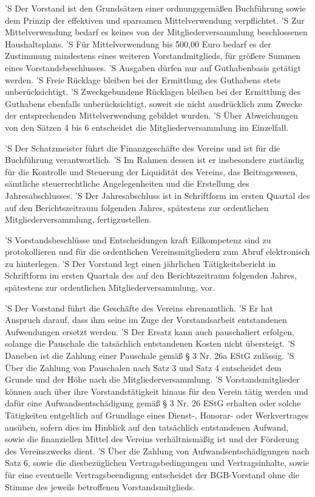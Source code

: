 \documentclass[a4paper,10pt]{scrreprt}
\begin{document}
\begin{contract}
'S Der Vorstand ist den Grundsätzen einer ordnungsgemäßen Buchführung sowie dem
Prinzip der effektiven und sparsamen Mittelverwendung verpflichtet.
'S Zur Mittelverwendung bedarf es keines von der Mitgliederversammlung
beschlossenen Haushaltsplans.
'S Für Mittelverwendung bis 500,00 Euro bedarf es der Zustimmung mindestens
eines weiteren Vorstandmitglieds, für größere Summen eines Vorstandsbeschlusses.
'S Ausgaben dürfen nur auf Guthabenbasis getätigt werden.
'S Freie Rücklage bleiben bei der Ermittlung des Guthabens stets
unberücksichtigt.
'S Zweckgebundene Rücklagen bleiben bei der Ermittlung des Guthabens ebenfalls
unberücksichtigt, soweit sie nicht ausdrücklich zum Zwecke der entsprechenden
Mittelverwendung gebildet wurden.
'S Über Abweichungen von den Sätzen 4 bis 6 entscheidet die
Mitgliederversammlung im Einzelfall.

'S Der Schatzmeister führt die Finanzgeschäfte des Vereins und ist für die
Buchführung verantwortlich.
'S Im Rahmen dessen ist er insbesondere zuständig für die Kontrolle und
Steuerung der Liquidität des Vereins, das Beitragswesen, sämtliche
steuerrechtliche Angelegenheiten und die Erstellung des Jahresabschlusses.
'S Der Jahresabschluss ist in Schriftform im ersten Quartal des auf den
Berichtszeitraum folgenden Jahres, spätestens zur ordentlichen
Mitgliederversammlung, fertigzustellen.

'S Vorstandsbeschlüsse und Entscheidungen kraft Eilkompetenz sind zu
protokollieren und für die ordentlichen Vereinsmitgliedern zum Abruf
elektronisch zu hinterlegen.
'S Der Vorstand legt einen jährlichen Tätigkeitsbericht in Schriftform im
ersten Quartals des auf den Berichtszeitraum folgenden Jahres, spätestens zur
ordentlichen Mitgliederversammlung, vor.

'S Der Vorstand führt die Geschäfte des Vereins ehrenamtlich.
'S Er hat Anspruch darauf, dass ihm seine im Zuge der Vorstandsarbeit
entstandenen Aufwendungen ersetzt werden.
'S Der Ersatz kann auch pauschaliert erfolgen, solange die Pauschale die
tatsächlich entstandenen Kosten nicht übersteigt.
'S Daneben ist die Zahlung einer Pauschale gemäß § 3 Nr. 26a EStG zulässig.
'S Über die Zahlung von Pauschalen nach Satz 3 und Satz 4 entscheidet dem
Grunde und der Höhe nach die Mitgliederversammlung.
'S Vorstandsmitglieder können auch über ihre Vorstandstätigkeit hinaus für den
Verein tätig werden und dafür eine Aufwandsentschädigung gemäß § 3 Nr. 26 EStG
erhalten oder solche Tätigkeiten entgeltlich auf Grundlage eines Dienst-,
Honorar- oder Werkvertrages ausüben, sofern dies im Hinblick auf den tatsächlich
entstandenen Aufwand, sowie die finanziellen Mittel des Vereins verhältnismäßig
ist und der Förderung des Vereinszwecks dient.
'S Über die Zahlung von Aufwandsentschädigungen nach Satz 6, sowie die
diesbezüglichen Vertragsbedingungen und Vertragsinhalte, sowie für eine
eventuelle Vertragsbeendigung entscheidet der BGB-Vorstand ohne die Stimme
des jeweils betroffenen Vorstandsmitglieds.


\end{contract}
\end{document}
